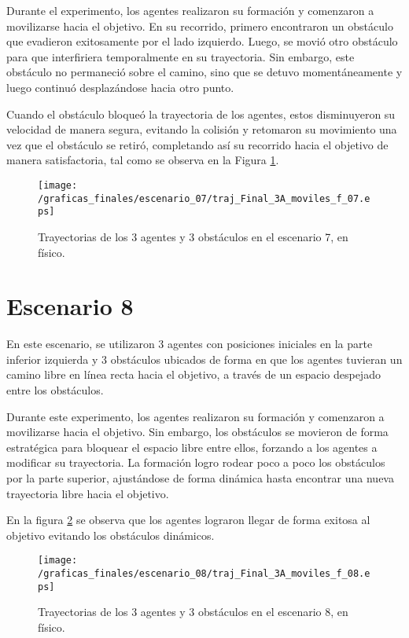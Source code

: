 Durante el experimento, los agentes realizaron su formación y comenzaron a movilizarse hacia el objetivo. En su recorrido, primero encontraron un obstáculo que evadieron exitosamente por el lado izquierdo. Luego, se movió otro obstáculo para que interfiriera temporalmente en su trayectoria. Sin embargo, este obstáculo no permaneció sobre el camino, sino que se detuvo momentáneamente y luego continuó desplazándose hacia otro punto. 

Cuando el obstáculo bloqueó la trayectoria de los agentes, estos disminuyeron su velocidad de manera segura, evitando la colisión y retomaron su movimiento una vez que el obstáculo se retiró, completando así su recorrido hacia el objetivo de manera satisfactoria, tal como se observa en la Figura \ref{fig3:escenario07_trajTodos}.

\begin{figure}[H]
	\centering
	\texttt{[image: /graficas\_finales/escenario\_07/traj\_Final\_3A\_moviles\_f\_07.eps]}
	\caption{Trayectorias de los 3 agentes y 3 obstáculos en el escenario 7, en físico.}
	\label{fig3:escenario07_trajTodos}
\end{figure}


\newpage
\section{Escenario 8}
En este escenario, se utilizaron 3 agentes con posiciones iniciales en la parte inferior izquierda y 3 obstáculos ubicados de forma en que los agentes tuvieran un camino libre en línea recta hacia el objetivo, a través de un espacio despejado entre los obstáculos.

Durante este experimento, los agentes realizaron su formación y comenzaron a movilizarse hacia el objetivo. Sin embargo, los obstáculos se movieron de forma estratégica para bloquear el espacio libre entre ellos, forzando a los agentes a modificar su trayectoria. La formación logro rodear poco a poco los obstáculos por la parte superior, ajustándose de forma dinámica hasta encontrar una nueva trayectoria libre hacia el objetivo. 

En la figura \ref{fig3:escenario08_trajTodos} se observa que los agentes lograron llegar de forma exitosa al objetivo evitando los obstáculos dinámicos.


\begin{figure}[H]
	\centering
	\texttt{[image: /graficas\_finales/escenario\_08/traj\_Final\_3A\_moviles\_f\_08.eps]}
	\caption{Trayectorias de los 3 agentes y 3 obstáculos en el escenario 8, en físico.}
	\label{fig3:escenario08_trajTodos}
\end{figure}

